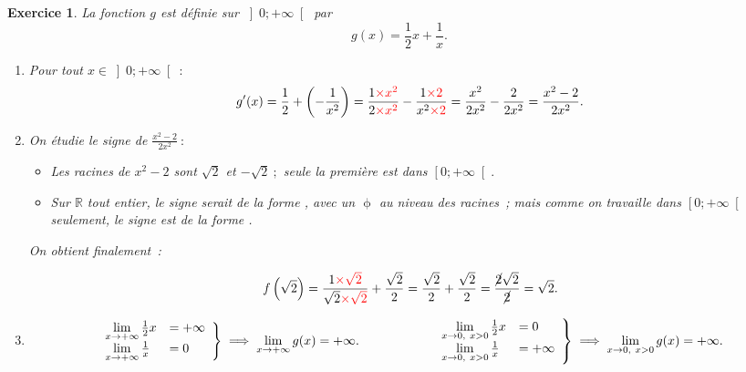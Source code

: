 \documentclass[10pt]{article}
\newtheorem{exo}{Exercice}
\begin{document}
\newpage

\begin{exo}



La fonction $g$ est définie sur $\left]0;+\infty\right[$ par
\[g(x)=\frac{1}{2}x+\frac{1}{x}.\]


\begin{enumerate}
\item Pour tout $x\in \left]0;+\infty\right[~:$
\[g'(x)=\frac{1}{2}+\left(-\frac{1}{x^2}\right)=\frac{1\textcolor{red}{\times x^2}}{2\textcolor{red}{\times x^2}}-\frac{1\textcolor{red}{\times 2}}{x^2\textcolor{red}{\times 2}}=\frac{x^2}{2x^2}-\frac{2}{2x^2}=\frac{x^2-2}{2x^2}.\]
\item On étudie le signe de $\frac{x^2-2}{2x^2}~:$

\begin{itemize}
\item[\textbullet] Les racines de $x^2-2$ sont $\sqrt{2}$ et $-\sqrt{2}~;$ seule la première est dans $\left[0;+\infty\right[.$
\item[\textbullet] Sur $\mathbb{R}$ tout entier, le signe serait de la forme \fbox{$+~\upphi~-~\upphi~+$}, avec un $\upphi$ au niveau des racines~; mais comme on travaille dans $\left[0;+\infty\right[$ seulement,  le signe est de la forme \fbox{$-~\upphi~+$}.
\end{itemize}

\medskip

On obtient finalement~:

\begin{center}
\end{center}

\medskip

\[f\left(\sqrt{2}\right)=\frac{1\textcolor{red}{\times\sqrt{2}}}{\sqrt{2}\textcolor{red}{\times\sqrt{2}}}+\frac{\sqrt{2}}{2}=\frac{\sqrt{2}}{2}+\frac{\sqrt{2}}{2}=\frac{\cancel{2}\sqrt{2}}{\cancel{2}}=\sqrt{2}.\]

\item
\[
\left.
    \begin{array}{ll}
        \lim\limits_{x\to +\infty}\frac{1}{2}x&=  +\infty\\
        \lim\limits_{x\to +\infty}\frac{1}{x} &= 0
    \end{array}
\right \}\implies \lim\limits_{x\to +\infty}g(x)=+\infty.
\hspace*{2cm}
\left.
    \begin{array}{ll}
        \lim\limits_{x\to 0,~x>0}\frac{1}{2}x&=  0\\
        \lim\limits_{x\to 0,~x>0}\frac{1}{x} &= +\infty
    \end{array}
\right \}\implies \lim\limits_{x\to 0,~x>0}g(x)=+\infty.
\]


\end{enumerate}
\end{exo}
\end{document}

